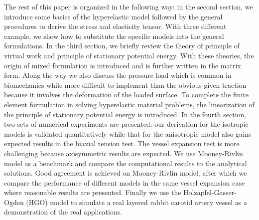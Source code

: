 The rest of this paper is organized in the following way: in the second section, we introduce some basics of the hyperelastic model followed by the general procedures to derive the stress and elasticity tensor. With three different example, we show how to substitute the specific models into the general formulations. In the third section, we briefly review the theory of principle of virtual work and principle of stationary potential energy. With these theories, the origin of mixed formulation is introduced and is further written in the matrix form. Along the way we also discuss the pressure load which is common in biomechanics while more difficult to implement than the obvious given traction because it involves the deformation of the loaded surface. To complete the finite element formulation in solving hyperelastic material problems, the linearization of the principle of stationary potential energy is introduced. In the fourth section, two sets of numerical experiments are presented: our derivation for the isotropic models is validated quantitatively while that for the anisotropic model also gains expected results in the biaxial tension test. The vessel expansion test is more challenging because axisymmetric results are expected. We use Mooney-Rivlin model as a benchmark and compare the computational results to the analytical solutions. Good agreement is achieved on Mooney-Rivlin model, after which we compare the performance of different models in the same vessel expansion case where reasonable results are presented. Finally we use the Holzapfel-Gasser-Ogden (HGO) model to simulate a real layered rabbit carotid artery vessel as a demonstration of the real applications.


 



